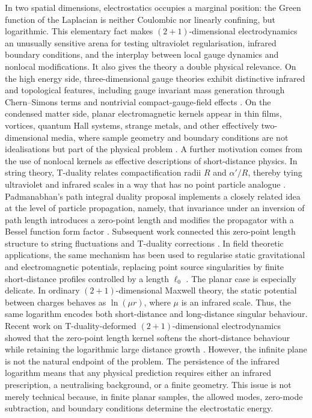 \documentclass[nopacs,amsmath,amsfonts,amssymb,aps,superscriptaddress]{revtex4}
\begin{document}
In two spatial dimensions, electrostatics occupies a marginal position: the Green function of the Laplacian is neither Coulombic nor linearly confining, but logarithmic. This elementary fact makes $(2+1)$-dimensional electrodynamics an unusually sensitive arena for testing ultraviolet regularisation, infrared boundary conditions, and the interplay between local gauge dynamics and nonlocal modifications. It also gives the theory a double physical relevance. On the high energy side, three-dimensional gauge theories exhibit distinctive infrared and topological features, including gauge invariant mass generation through Chern–Simons terms and nontrivial compact-gauge-field effects \cite{DeserJackiwTempleton1982, Polyakov1975}. On the condensed matter side, planar electromagnetic kernels appear in thin films, vortices, quantum Hall systems, strange metals, and other effectively two-dimensional media, where sample geometry and boundary conditions are not idealisations but part of the physical problem \cite{Pearl1964, KosterlitzThouless1973, LaNaveLimtragoolPhillips2019}. A further motivation comes from the use of nonlocal kernels as effective descriptions of short-distance physics. In string theory, T-duality relates compactification radii $R$ and $\alpha'/R$, thereby tying ultraviolet and infrared scales in a way that has no point particle analogue \cite{Sathiapalan1987, GiveonPorratiRabinovici1994}. Padmanabhan’s path integral duality proposal implements a closely related idea at the level of particle propagation, namely, that invariance under an inversion of path length introduces a zero-point length and modifies the propagator with a Bessel function form factor \cite{Padmanabhan1997}. Subsequent work connected this zero-point length structure to string fluctuations and T-duality corrections \cite{SmailagicSpallucciPadmanabhan2003, FontaniniSpallucciPadmanabhan2006}. In field theoretic applications, the same mechanism has been used to regularise static gravitational and electromagnetic potentials, replacing point source singularities by finite short-distance profiles controlled by a length $\ell_0$ \cite{NicoliniSpallucciWondrak2019, GaeteNicolini2022}. The planar case is especially delicate. In ordinary $(2+1)$-dimensional Maxwell theory, the static potential between charges behaves as $\ln{(\mu r)}$, where $\mu$ is an infrared scale. Thus, the same logarithm encodes both short-distance and long-distance singular behaviour. Recent work on T-duality-deformed $(2+1)$-dimensional electrodynamics showed that the zero-point length kernel softens the short-distance behaviour while retaining the logarithmic large distance growth \cite{GaeteNicolini2026}. However, the infinite plane is not the natural endpoint of the problem. The persistence of the infrared logarithm means that any physical prediction requires either an infrared prescription, a neutralising background, or a finite geometry. This issue is not merely technical because, in finite planar samples, the allowed modes, zero-mode subtraction, and boundary conditions determine the electrostatic energy.
\end{document}
